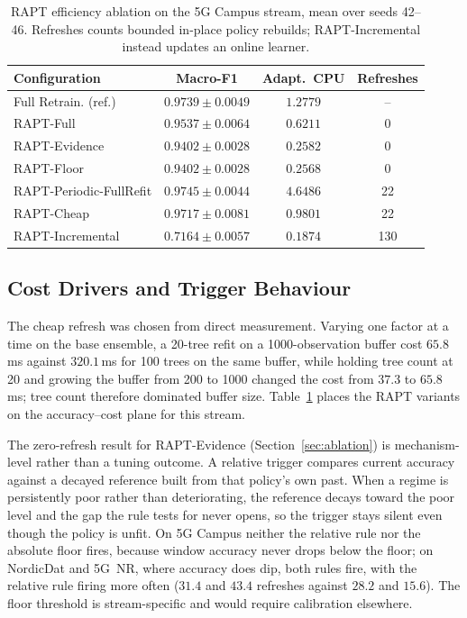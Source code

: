 \documentclass[conference]{IEEEtran}
\begin{document}
\begin{table}[t]
\caption{RAPT efficiency ablation on the 5G Campus stream, mean over seeds 42--46.
Refreshes counts bounded in-place policy rebuilds; RAPT-Incremental instead updates
an online learner.}
\label{tab:ablation}
\centering
\scriptsize
\begin{tabular}{@{}lccc@{}}
\toprule
\textbf{Configuration} & \textbf{Macro-F1} & \textbf{Adapt.\ CPU} & \textbf{Refreshes} \\
\midrule
Full Retrain. (ref.) & $0.9739 \pm 0.0049$ & $1.2779$ & -- \\
RAPT-Full              & $0.9537 \pm 0.0064$ & $0.6211$ & 0 \\
RAPT-Evidence          & $0.9402 \pm 0.0028$ & $0.2582$ & 0 \\
RAPT-Floor             & $0.9402 \pm 0.0028$ & $0.2568$ & 0 \\
RAPT-Periodic-FullRefit & $\mathbf{0.9745 \pm 0.0044}$ & $4.6486$ & 22 \\
RAPT-Cheap             & $0.9717 \pm 0.0081$ & $0.9801$ & 22 \\
RAPT-Incremental       & $0.7164 \pm 0.0057$ & $0.1874$ & 130 \\
\bottomrule
\end{tabular}
\end{table}

\subsection{Cost Drivers and Trigger Behaviour}
\label{sec:cost}
The cheap refresh was chosen from direct measurement. Varying one factor at a time on
the base ensemble, a 20-tree refit on a 1000-observation buffer cost $65.8$\,ms
against $320.1$\,ms for 100 trees on the same buffer, while holding tree count at 20
and growing the buffer from 200 to 1000 changed the cost from $37.3$ to $65.8$\,ms;
tree count therefore dominated buffer size. Table~\ref{tab:ablation} places the RAPT
variants on the accuracy--cost plane for this stream.

\label{sec:trigger}
The zero-refresh result for RAPT-Evidence (Section~\ref{sec:ablation}) is
mechanism-level rather than a tuning outcome. A relative trigger compares current
accuracy against a decayed reference built from that policy's own past. When a regime
is persistently poor rather than deteriorating, the reference decays toward the poor
level and the gap the rule tests for never opens, so the trigger stays silent even
though the policy is unfit. On 5G Campus neither the relative rule nor the absolute
floor fires, because window accuracy never drops below the floor; on NordicDat and
5G~NR, where accuracy does dip, both rules fire, with the relative rule firing more
often ($31.4$ and $43.4$ refreshes against $28.2$ and $15.6$). The floor threshold is
stream-specific and would require calibration elsewhere.
\end{document}
